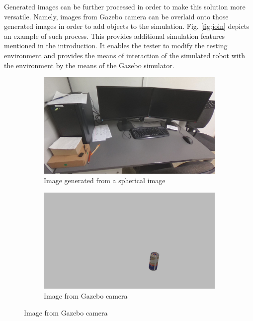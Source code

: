 \documentclass{svproc}
\begin{document}
Generated images can be further processed in order to make this solution more versatile.
Namely, images from Gazebo camera can be overlaid onto those generated images in order to add objects to the simulation.
Fig. \ref{fig:join} depicts an example of such process.
This provides additional simulation features mentioned in the introduction.
It enables the tester to modify the testing environment and provides the means of interaction of the simulated robot with the environment by the means of the Gazebo simulator.
\begin{figure}[!ht]
    \centering
    \begin{subfigure}{.46\textwidth}
        \includegraphics[width=\linewidth]{img/gazebo_integration/sim.jpg}
        \caption{Image generated from a spherical image}
        \vspace*{1em}
    \end{subfigure}\hfill%
    \begin{subfigure}{.46\textwidth}
        \includegraphics[width=\linewidth]{img/gazebo_integration/gazebo.jpg}
        \caption{Image from Gazebo camera}
        \vspace*{1em}

\end{subfigure}
\end{figure}
\end{document}
